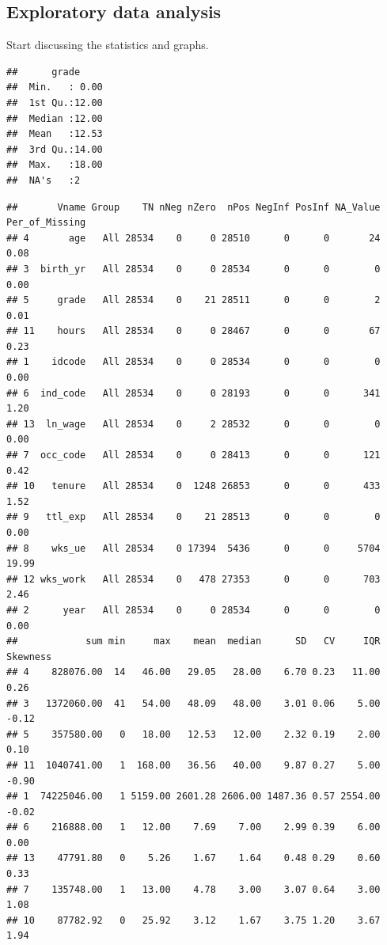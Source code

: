 \documentclass[
]{article}
\begin{document}
\hypertarget{exploratory-data-analysis}{%
\subsection{Exploratory data analysis}\label{exploratory-data-analysis}}

Start discussing the statistics and graphs.

\begin{verbatim}
##      grade      
##  Min.   : 0.00  
##  1st Qu.:12.00  
##  Median :12.00  
##  Mean   :12.53  
##  3rd Qu.:14.00  
##  Max.   :18.00  
##  NA's   :2
\end{verbatim}

\begin{verbatim}
##       Vname Group    TN nNeg nZero  nPos NegInf PosInf NA_Value Per_of_Missing
## 4       age   All 28534    0     0 28510      0      0       24           0.08
## 3  birth_yr   All 28534    0     0 28534      0      0        0           0.00
## 5     grade   All 28534    0    21 28511      0      0        2           0.01
## 11    hours   All 28534    0     0 28467      0      0       67           0.23
## 1    idcode   All 28534    0     0 28534      0      0        0           0.00
## 6  ind_code   All 28534    0     0 28193      0      0      341           1.20
## 13  ln_wage   All 28534    0     2 28532      0      0        0           0.00
## 7  occ_code   All 28534    0     0 28413      0      0      121           0.42
## 10   tenure   All 28534    0  1248 26853      0      0      433           1.52
## 9   ttl_exp   All 28534    0    21 28513      0      0        0           0.00
## 8    wks_ue   All 28534    0 17394  5436      0      0     5704          19.99
## 12 wks_work   All 28534    0   478 27353      0      0      703           2.46
## 2      year   All 28534    0     0 28534      0      0        0           0.00
##            sum min     max    mean  median      SD   CV     IQR Skewness
## 4    828076.00  14   46.00   29.05   28.00    6.70 0.23   11.00     0.26
## 3   1372060.00  41   54.00   48.09   48.00    3.01 0.06    5.00    -0.12
## 5    357580.00   0   18.00   12.53   12.00    2.32 0.19    2.00     0.10
## 11  1040741.00   1  168.00   36.56   40.00    9.87 0.27    5.00    -0.90
## 1  74225046.00   1 5159.00 2601.28 2606.00 1487.36 0.57 2554.00    -0.02
## 6    216888.00   1   12.00    7.69    7.00    2.99 0.39    6.00     0.00
## 13    47791.80   0    5.26    1.67    1.64    0.48 0.29    0.60     0.33
## 7    135748.00   1   13.00    4.78    3.00    3.07 0.64    3.00     1.08
## 10    87782.92   0   25.92    3.12    1.67    3.75 1.20    3.67     1.94

\end{verbatim}
\end{document}
